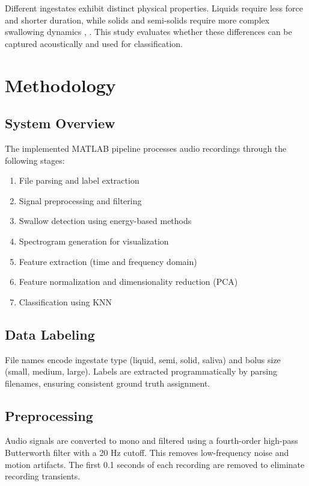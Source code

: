 \documentclass[conference]{IEEEtran}
\begin{document}
Different ingestates exhibit distinct physical properties. Liquids require less force and shorter duration, while solids and semi-solids require more complex swallowing dynamics \cite{4}, \cite{5}. This study evaluates whether these differences can be captured acoustically and used for classification.

\section{Methodology}

\subsection{System Overview}

The implemented MATLAB pipeline processes audio recordings through the following stages:

\begin{enumerate}
    \item File parsing and label extraction
    \item Signal preprocessing and filtering
    \item Swallow detection using energy-based methods
    \item Spectrogram generation for visualization
    \item Feature extraction (time and frequency domain)
    \item Feature normalization and dimensionality reduction (PCA)
    \item Classification using KNN
\end{enumerate}

\subsection{Data Labeling}

File names encode ingestate type (liquid, semi, solid, saliva) and bolus size (small, medium, large). Labels are extracted programmatically by parsing filenames, ensuring consistent ground truth assignment.

\subsection{Preprocessing}

Audio signals are converted to mono and filtered using a fourth-order high-pass Butterworth filter with a 20 Hz cutoff. This removes low-frequency noise and motion artifacts. The first 0.1 seconds of each recording are removed to eliminate recording transients.
\end{document}
